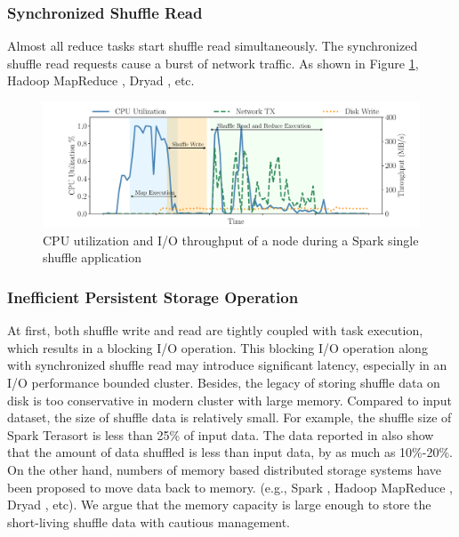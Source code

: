 \subsubsection{Synchronized Shuffle Read}
Almost all reduce tasks start shuffle read simultaneously. 
The synchronized shuffle read requests cause a burst of network traffic. 
As shown in Figure \ref{fig:util}, 
 Hadoop MapReduce \cite{hadoop}, Dryad \cite{dryad}, etc.

\begin{figure}
	\includegraphics[width=\linewidth]{fig/util}
	\caption{CPU utilization and I/O throughput of a node during a Spark single shuffle application}
	\label{fig:util}
	\vspace{-1em}
\end{figure}

\subsubsection{Inefficient Persistent Storage Operation}
At first, both shuffle write and read are tightly coupled with task execution, which results in a blocking I/O operation. 
This blocking I/O operation along with synchronized shuffle read may introduce significant latency, especially in an I/O performance bounded cluster.
Besides, the legacy of storing shuffle data on disk is too conservative in modern cluster with large memory. 
Compared to input dataset, the size of shuffle data is relatively small. 
For example, the shuffle size of Spark Terasort \cite{spark-tera} is less than 25\% of input data. 
The data reported in \cite{makingsense} also show that the amount of data shuffled is less than input data, by as much as 10\%-20\%. 
\ifrevision
{}
\fi
On the other hand, numbers of memory based distributed storage systems have been proposed \cite{memcached, tachyon, ramcloud} to move data back to memory. 
(e.g., Spark \cite{apachespark}, Hadoop MapReduce \cite{hadoop}, Dryad \cite{dryad}, etc).
We argue that the memory capacity is large enough to store the short-living shuffle data with cautious management.

